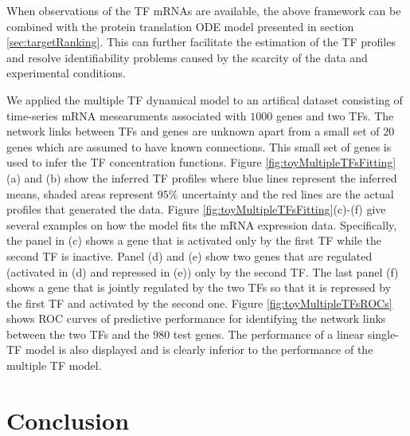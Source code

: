 \documentclass{article}
\begin{document}
When observations of the TF mRNAs are available, the above framework
can be combined with the protein translation ODE model presented in
section \ref{sec:targetRanking}.  This can further facilitate the
estimation of the TF profiles and resolve identifiability problems
caused by the scarcity of the data and experimental conditions.


We applied the multiple TF dynamical model to an artifical dataset
consisting of time-series mRNA mesearuments associated with $1000$
genes and two TFs. The network links between TFs and genes are unknown
apart from a small set of $20$ genes which are assumed to have known
connections. This small set of genes is used to infer the TF
concentration functions. Figure \ref{fig:toyMultipleTFsFitting}(a) and
(b) show the inferred TF profiles where blue lines represent the
inferred means, shaded areas represent $95\%$ uncertainty and the red
lines are the actual profiles that generated the data. Figure
\ref{fig:toyMultipleTFsFitting}(c)-(f) give several examples on how
the model fits the mRNA expression data.  Specifically, the panel in
(c) shows a gene that is activated only by the first TF while the
second TF is inactive.  Panel (d) and (e) show two genes that are
regulated (activated in (d) and repressed in (e)) only by the second
TF.  The last panel (f) shows a gene that is jointly regulated by the
two TFs so that it is repressed by the first TF and activated by the
second one.  Figure \ref{fig:toyMultipleTFsROCs} shows ROC curves of
predictive performance for identifying the network links between the
two TFs and the $980$ test genes.  The performance of a linear
single-TF model is also displayed and is clearly inferior to the
performance of the multiple TF model.


\section{Conclusion}
\end{document}
